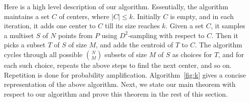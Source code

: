 \documentclass[11pt]{article}
\begin{document}
Here is a high level description of our algorithm. 
Essentially, the algorithm maintains a set $C$ of centers, where $|C| \leq k$. 
Initially $C$ is empty, and in each iteration, it adds one center to $C$ till its size reaches $k$. 
Given a set $C$, it samples a multiset $S$ of $N$ points from $P$ using $D^2$-sampling with respect to $C$. 
Then it picks  a subset $T$ of $S$ of size $M$, and adds the centroid of $T$ to $C$. 
The algorithm cycles through all possible $\binom{N}{M}$ subsets of size $M$ of $S$ as choices for $T$, and for each such choice,
repeats the above steps to find the next center, and so on. 
Repetition is done for probability amplification.
Algorithm~\ref{fig:k} gives a concise representation of the above algorithm.
Next, we state our main theorem with respect to our algorithm and prove this theorem in the rest of this section.
\end{document}
